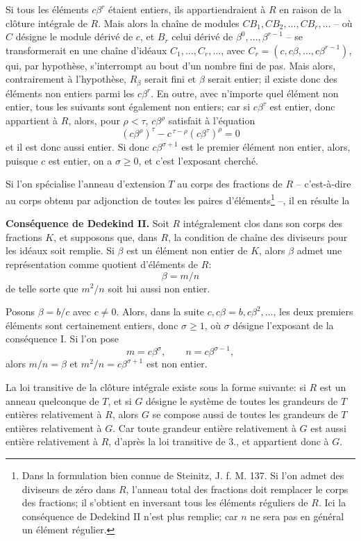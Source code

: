 Si tous les éléments $c\beta^r$ étaient entiers, ils appartiendraient à $R$ en raison de la clôture intégrale de $R$. Mais alors la chaîne de modules $CB_1,CB_2,\ldots,CB_r,\ldots$ -- où $C$ désigne le module dérivé de $c$, et $B_r$ celui dérivé de $\beta^0,\ldots,\beta^{r-1}$ -- se transformerait en une chaîne d'idéaux $C_1,\ldots,C_r,\ldots$, avec $C_r=(c,c\beta,\ldots,c\beta^{r-1})$, qui, par hypothèse, s'interrompt au bout d'un nombre fini de pas. Mais alors, contrairement à l'hypothèse, $R_\beta$ serait fini et $\beta$ serait entier; il existe donc des éléments non entiers parmi les $c\beta^r$. En outre, avec n'importe quel élément non entier, tous les suivants sont également non entiers; car si $c\beta^\tau$ est entier, donc appartient à $R$, alors, pour $\rho<\tau$, $c\beta^\rho$ satisfait à l'équation
\[
        (c\beta^\rho)^\tau-c^{\,\tau-\rho}(c\beta^\tau)^\rho=0
\]
et il est donc aussi entier. Si donc $c\beta^{\sigma+1}$ est le premier élément non entier, alors, puisque $c$ est entier, on a $\sigma\ge0$, et c'est l'exposant cherché.

Si l'on spécialise l'anneau d'extension $T$ au corps des fractions de $R$ -- c'est-à-dire au corps obtenu par adjonction de toutes les paires d'éléments\footnote{Dans la formulation bien connue de Steinitz, J. f. M. 137. Si l'on admet des diviseurs de zéro dans $R$, l'anneau total des fractions doit remplacer le corps des fractions; il s'obtient en inversant tous les éléments réguliers de $R$. Ici la conséquence de Dedekind II n'est plus remplie; car $n$ ne sera pas en général un élément régulier.} --, il en résulte la

\medskip
\noindent\textbf{Conséquence de Dedekind II.} Soit $R$ intégralement clos dans son corps des fractions $K$, et supposons que, dans $R$, la condition de chaîne des diviseurs pour les idéaux soit remplie. Si $\beta$ est un élément non entier de $K$, alors $\beta$ admet une représentation comme quotient d'éléments de $R$:
\[
        \beta=m/n
\]
de telle sorte que $m^2/n$ soit lui aussi non entier.

Posons $\beta=b/c$ avec $c\ne0$. Alors, dans la suite $c,c\beta=b,c\beta^2,\ldots$, les deux premiers éléments sont certainement entiers, donc $\sigma\ge1$, où $\sigma$ désigne l'exposant de la conséquence I. Si l'on pose
\[
        m=c\beta^\sigma,\qquad n=c\beta^{\sigma-1},
\]
alors $m/n=\beta$ et $m^2/n=c\beta^{\sigma+1}$ est non entier.

La loi transitive de la clôture intégrale existe sous la forme suivante: si $R$ est un anneau quelconque de $T$, et si $G$ désigne le système de toutes les grandeurs de $T$ entières relativement à $R$, alors $G$ se compose aussi de toutes les grandeurs de $T$ entières relativement à $G$. Car toute grandeur entière relativement à $G$ est aussi entière relativement à $R$, d'après la loi transitive de 3., et appartient donc à $G$.
